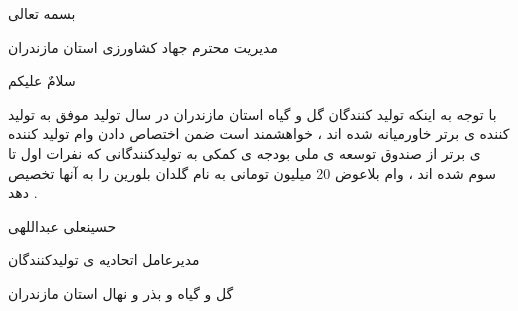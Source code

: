 \documentclass[12pt,a5paper]{article}
\begin{document}

\begin{center}
\noindent
بسمه تعالی
\end{center}


\noindent
مدیریت محترم جهاد کشاورزی استان مازندران

\noindent
سلامٌ علیکم
\newline

\noindent
با توجه به اینکه تولید کنندگان گل و گیاه استان مازندران در سال تولید موفق به تولید کننده ی برتر خاورمیانه شده اند ، خواهشمند است ضمن اختصاص دادن وام تولید کننده ی برتر از صندوق توسعه ی ملی بودجه ی کمکی به تولیدکنندگانی که نفرات اول تا سوم شده اند ، وام بلاعوض 20 میلیون تومانی به نام گلدان بلورین را به آنها تخصیص دهد .
\newline
\newline

\begin{center}
\noindent
حسینعلی عبداللهی

\noindent
مدیرعامل اتحادیه ی تولیدکنندگان

\noindent
 گل و گیاه و بذر و نهال استان مازندران
\end{center}
\end{document}
